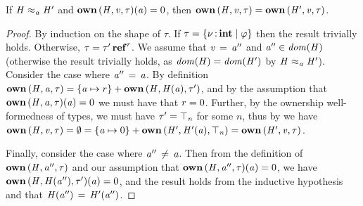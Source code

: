 \begin{lemma} %
  \label{lem:heapop}
  If $ \mathit{H}   \approx _ {\mathit{a}}   \mathit{H'} $ and $\mathbf{own} \, (  \mathit{H}  ,  \mathit{v}  ,  \tau  )  (  \mathit{a}  )  =  0$, then
  $\mathbf{own} \, (  \mathit{H}  ,  \mathit{v}  ,  \tau  )  =  \mathbf{own} \, (  \mathit{H'}  ,  \mathit{v}  ,  \tau  )$.
\end{lemma}
\begin{proof}
  By induction on the shape of $\tau$. If $\tau  =   \left\{{  \nu  \operatorname{:} \mathbf{int} \mid  \varphi }\right\} $ then
  the result trivially holds. Otherwise, $\tau  =   \tau'  \operatorname{\mathbf{ref}}^{ r } $. We assume
  that $\mathit{v} \, = \, \mathit{a''}$ and $ \mathit{a''}  \in \mathit{dom}( \mathit{H} ) $ (otherwise the result
  trivially holds, as $ \mathit{dom}( \mathit{H} )   =   \mathit{dom}( \mathit{H'} ) $ by $ \mathit{H}   \approx _ {\mathit{a}}   \mathit{H'} $).
  Consider the case where $\mathit{a''} \, = \, \mathit{a}$. By definition
  $\mathbf{own} \, (  \mathit{H}  ,  \mathit{a}  ,  \tau  )  =  \{  \mathit{a}  \mapsto  r  \}  +  \mathbf{own} \, (  \mathit{H}  ,  \mathit{H}  (  \mathit{a}  )  ,  \tau'  )$, and by the
  assumption that $\mathbf{own} \, (  \mathit{H}  ,  \mathit{a}  ,  \tau  )  (  \mathit{a}  )  =  0$ we must have that
  $r  =  0$. Further, by the ownership well-formedness of types,
  we must have $\tau'  =  \top_{\mathit{n}}$ for some $n$, thus by 
  we have $\mathbf{own} \, (  \mathit{H}  ,  \mathit{v}  ,  \tau  )  =   \emptyset   =  \{  \mathit{a}  \mapsto  0  \}  +  \mathbf{own} \, (  \mathit{H'}  ,  \mathit{H'}  (  \mathit{a}  )  ,  \top_{\mathit{n}}  )  =  \mathbf{own} \, (  \mathit{H'}  ,  \mathit{v}  ,  \tau  )$.

  Finally, consider the case where $\mathit{a''} \, \neq \, \mathit{a}$. Then from the
  definition of $\mathbf{own} \, (  \mathit{H}  ,  \mathit{a''}  ,  \tau  )$ and our assumption that
  $\mathbf{own} \, (  \mathit{H}  ,  \mathit{a''}  ,  \tau  )  (  \mathit{a}  )  =  0$, we have $\mathbf{own} \, (  \mathit{H}  ,  \mathit{H}  (  \mathit{a''}  )  ,  \tau'  )  (  \mathit{a}  )  =  0$,
  and the result holds from the inductive hypothesis and that $\mathit{H}  (  \mathit{a''}  ) \, = \, \mathit{H'}  (  \mathit{a''}  )$.
\end{proof}


